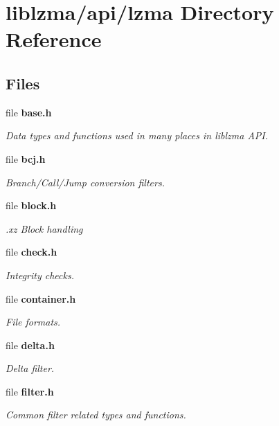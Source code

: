 \section{liblzma/api/lzma Directory Reference}
\label{dir_48cf7e51417fe935412ca5117cfff3c4}
\subsection*{Files}
\begin{DoxyCompactItemize}
\item 
file \textbf{ base.\+h}
\begin{DoxyCompactList}\small\item\em Data types and functions used in many places in liblzma A\+PI. \end{DoxyCompactList}\item 
file \textbf{ bcj.\+h}
\begin{DoxyCompactList}\small\item\em Branch/\+Call/\+Jump conversion filters. \end{DoxyCompactList}\item 
file \textbf{ block.\+h}
\begin{DoxyCompactList}\small\item\em .xz Block handling \end{DoxyCompactList}\item 
file \textbf{ check.\+h}
\begin{DoxyCompactList}\small\item\em Integrity checks. \end{DoxyCompactList}\item 
file \textbf{ container.\+h}
\begin{DoxyCompactList}\small\item\em File formats. \end{DoxyCompactList}\item 
file \textbf{ delta.\+h}
\begin{DoxyCompactList}\small\item\em Delta filter. \end{DoxyCompactList}\item 
file \textbf{ filter.\+h}
\begin{DoxyCompactList}\small\item\em Common filter related types and functions. \end{DoxyCompactList}\item 

\end{DoxyCompactItemize}
